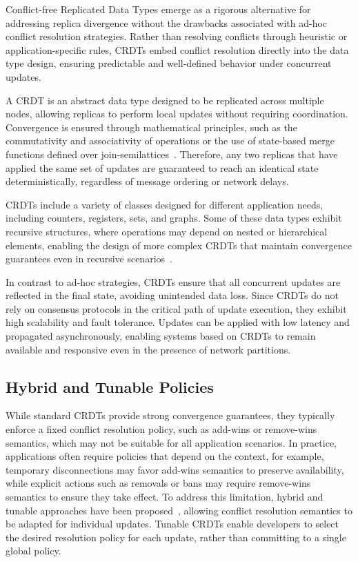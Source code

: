 Conflict-free Replicated Data Types emerge as a rigorous alternative for addressing replica divergence without the drawbacks associated with ad-hoc conflict resolution strategies. Rather than resolving conflicts through heuristic or application-specific rules, CRDTs embed conflict resolution directly into the data type design, ensuring predictable and well-defined behavior under concurrent updates.

A CRDT is an abstract data type designed to be replicated across multiple nodes, allowing replicas to perform local updates without requiring coordination. Convergence is ensured through mathematical principles, such as the commutativity and associativity of operations or the use of state-based merge functions defined over join-semilattices~\cite{shapiro2011comprehensive}. Therefore, any two replicas that have applied the same set of updates are guaranteed to reach an identical state deterministically, regardless of message ordering or network delays.

CRDTs include a variety of classes designed for different application needs, including counters, registers, sets, and graphs. Some of these data types exhibit recursive structures, where operations may depend on nested or hierarchical elements, enabling the design of more complex CRDTs that maintain convergence guarantees even in recursive scenarios~\cite{baquero2017nested}.

In contrast to ad-hoc strategies, CRDTs ensure that all concurrent updates are reflected in the final state, avoiding unintended data loss. Since CRDTs do not rely on consensus protocols in the critical path of update execution, they exhibit high scalability and fault tolerance. Updates can be applied with low latency and propagated asynchronously, enabling systems based on CRDTs to remain available and responsive even in the presence of network partitions.

\subsection{Hybrid and Tunable Policies}
\label{sub:hybrid}

While standard CRDTs provide strong convergence guarantees, they typically enforce a fixed conflict resolution policy, such as add-wins or remove-wins semantics, which may not be suitable for all application scenarios. In practice, applications often require policies that depend on the context, for example, temporary disconnections may favor add-wins semantics to preserve availability, while explicit actions such as removals or bans may require remove-wins semantics to ensure they take effect. To address this limitation, hybrid and tunable approaches have been proposed~\cite{rijo2018building}, allowing conflict resolution semantics to be adapted for individual updates. Tunable CRDTs enable developers to select the desired resolution policy for each update, rather than committing to a single global policy.

